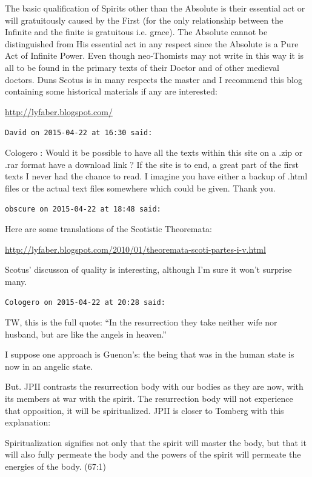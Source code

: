 \begin{footnotesize}
\begin{sffamily}
The basic qualification of Spirits other than the Absolute is their essential act or will gratuitously caused by the First (for the only relationship between the Infinite and the finite is gratuitous i.e. grace). The Absolute cannot be distinguished from His essential act in any respect since the Absolute is a Pure Act of Infinite Power. Even though neo-Thomists may not write in this way it is all to be found in the primary texts of their Doctor and of other medieval doctors. Duns Scotus is in many respects the master and I recommend this blog containing some historical materials if any are interested:

\url{http://lyfaber.blogspot.com/}


\hfill

\texttt{David on 2015-04-22 at 16:30 said:}

Cologero : Would it be possible to have all the texts within this site on a .zip or .rar format have a download link ? If the site is to end, a great part of the first texts I never had the chance to read. I imagine you have either a backup of .html files or the actual text files somewhere which could be given. Thank you.

\hfill

\texttt{obscure on 2015-04-22 at 18:48 said:}

Here are some translations of the Scotistic Theoremata:

\url{http://lyfaber.blogspot.com/2010/01/theoremata-scoti-partes-i-v.html}


Scotus' discusson of quality is interesting, although I'm sure it won't surprise many.

\hfill

\texttt{Cologero on 2015-04-22 at 20:28 said:}

TW, this is the full quote: ``In the resurrection they take neither wife nor husband, but are like the angels in heaven.''

I suppose one approach is Guenon's: the being that was in the human state is now in an angelic state.

But. JPII contrasts the resurrection body with our bodies as they are now, with its members at war with the spirit. The resurrection body will not experience that opposition, it will be spiritualized. JPII is closer to Tomberg with this explanation:

\begin{quotex}\footnotesize

Spiritualization signifies not only that the spirit will master the body, but that it will also fully permeate the body and the powers of the spirit will permeate the energies of the body. (67:1)
\end{quotex}



\end{sffamily}
\end{footnotesize}
